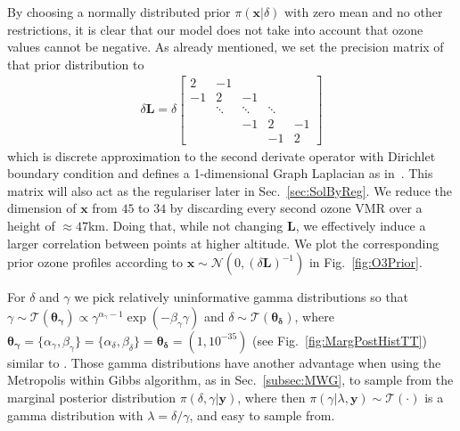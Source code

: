 By choosing a normally distributed prior $\pi(\bm{x}|\delta)$ with zero mean and no other restrictions, it is clear that our model does not take into account that ozone values cannot be negative.
As already mentioned, we set the precision matrix of that prior distribution to
\begin{align}
	\delta \bm{L} =
	\delta
	\begin{bmatrix}
		2 & -1 & & &  \\
		-1 & 2 & -1 & &   \\
		& \ddots & \ddots & \ddots &\\ 
		& & -1 & 2 & -1  \\
		& & & -1 & 2 
	\end{bmatrix} 
	\label{eq:GLapl} 
\end{align}
which is discrete approximation to the second derivate operator with Dirichlet boundary condition and defines a 1-dimensional Graph Laplacian as in~\cite{wang2015graphs, fox2016fast}.
This matrix will also act as the regulariser later in Sec.~\ref{sec:SolByReg}.
We reduce the dimension of $\bm{x}$ from $45$ to $34$ by discarding every second ozone VMR over a height of $\approx47$km.
Doing that, while not changing $\bm{L}$, we effectively induce a larger correlation between points at higher altitude.
We plot the corresponding prior ozone profiles according to $\bm{x}\sim \mathcal{N}(0, (\delta \bm{L})^{-1})$ in Fig.~\ref{fig:O3Prior}.

For $\delta$ and $\gamma$ we pick relatively uninformative gamma distributions so that $\gamma \sim \mathcal{T}(\bm{\theta_{\gamma}}) \propto \gamma^{\alpha_\gamma -1 } \exp{( -\beta_\gamma \gamma) } $ and $\delta \sim \mathcal{T}(\bm{\theta_{\delta}})$, where $\bm{\theta_{\gamma}} = \{  \alpha_\gamma, \beta_\gamma\}  = \{ \alpha_\delta ,\beta_\delta\} = \bm{\theta_{\delta}} = (1,10^{-35})$ (see Fig.~\ref{fig:MargPostHistTT}) similar to \cite{fox2016fast}.
Those gamma distributions have another advantage when using the Metropolis within Gibbs algorithm, as in Sec.~\ref{subsec:MWG}, to sample from the marginal posterior distribution $\pi(\delta, \gamma | \bm{y})$, where then $\pi(\gamma | \lambda, \bm{y}) \sim \mathcal{T}(\cdot)$ is a gamma distribution with $\lambda = \delta / \gamma $, and easy to sample from.

